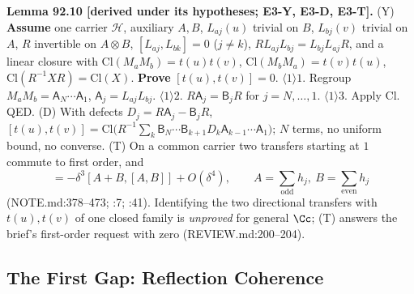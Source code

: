 \textbf{Lemma 92.10 [derived under its hypotheses; E3-Y, E3-D, E3-T].}  (Y) \textbf{Assume} one carrier
\(\mathcal H\), auxiliary \(A,B\), \(L_{aj}(u)\) trivial on \(B\), \(L_{bj}(v)\) trivial on \(A\), \(R\) invertible on
\(A\otimes B\), \([L_{aj},L_{bk}]=0\) (\(j\neq k\)), \(RL_{aj}L_{bj}=L_{bj}L_{aj}R\), and a linear closure with
\(\mathrm{Cl}(M_aM_b)=t(u)t(v)\), \(\mathrm{Cl}(M_bM_a)=t(v)t(u)\), \(\mathrm{Cl}(R^{-1}XR)=\mathrm{Cl}(X)\).
\textbf{Prove} \([t(u),t(v)]=0\).  \(\langle1\rangle1\). Regroup \(M_aM_b=\mathsf A_N\cdots\mathsf A_1\),
\(\mathsf A_j=L_{aj}L_{bj}\).  \(\langle1\rangle2\). \(R\mathsf A_j=\mathsf B_jR\) for \(j=N,\dots,1\).  \(\langle1\rangle3\).
Apply \(\mathrm{Cl}\).  QED.  (D) With defects \(D_j=R\mathsf A_j-\mathsf B_jR\),
\([t(u),t(v)]=\mathrm{Cl}\big(R^{-1}\sum_k\mathsf B_N\cdots\mathsf B_{k+1}D_k\mathsf A_{k-1}\cdots\mathsf A_1\big)\); \(N\) terms,
no uniform bound, no converse.  (T) On a common carrier two transfers starting at \(1\) commute to first order, and
\begin{equation}
  [e^{\delta A}e^{\delta B},e^{\delta B}e^{\delta A}]=-\delta^3[A+B,[A,B]]+O(\delta^4),\qquad
  A=\textstyle\sum_{\mathrm{odd}}h_j,\ B=\sum_{\mathrm{even}}h_j\tag{92.4}
\end{equation}
(NOTE.md:378--473; :7; :41).  Identifying the two directional transfers
with \(t(u),t(v)\) of one closed family is \emph{unproved} for general \(\Cc\); (T) answers the brief's first-order
request with zero (REVIEW.md:200--204).

\subsection{The First Gap: Reflection Coherence}

